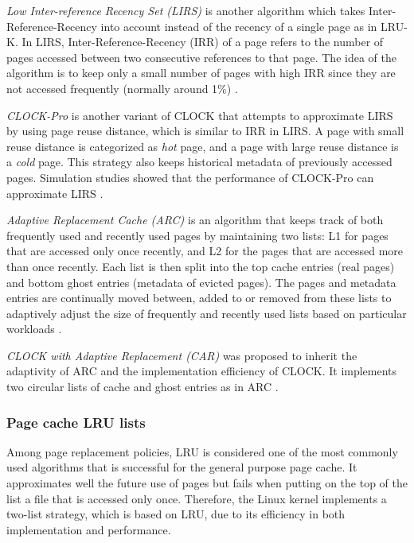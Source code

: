 \textit{Low Inter-reference Recency Set (LIRS)} is another algorithm 
which takes Inter-Reference-Recency into account instead of the recency 
of a single page as in LRU-K. 
In LIRS, Inter-Reference-Recency (IRR) of a page refers to the 
number of pages accessed between two consecutive references to that page. 
The idea of the algorithm is to keep only a small number of pages with 
high IRR since they are not accessed frequently (normally around 1\%) 
\cite{chavan2011comparison}. 

\textit{CLOCK-Pro} is another variant of CLOCK that attempts to approximate 
LIRS by using page reuse distance, which is similar to IRR in LIRS. 
A page with small reuse distance is categorized as \textit{hot} page, 
and a page with large reuse distance is a \textit{cold} page. This strategy also 
keeps historical metadata of previously accessed pages. 
Simulation studies showed that the performance of CLOCK-Pro can 
approximate LIRS \cite{chavan2011comparison}. 

\textit{Adaptive Replacement Cache (ARC)} is an algorithm that keeps track of
both frequently used and recently used pages by maintaining two lists: 
L1 for pages that are accessed only once recently, and L2 for the pages 
that are accessed more than once recently. 
Each list is then split into the top cache entries (real pages) and bottom 
ghost entries (metadata of evicted pages). 
The pages and metadata entries are continually moved between, 
added to or removed from these lists to adaptively adjust the size 
of frequently and recently used lists based on particular workloads  
\cite{chavan2011comparison}. 

\textit{CLOCK with Adaptive Replacement (CAR)} was proposed to inherit 
the adaptivity of ARC and the implementation efficiency of CLOCK.  
It implements two circular lists of cache and ghost entries as in ARC 
\cite{chavan2011comparison}. 

\subsubsection{Page cache LRU lists}

Among page replacement policies, LRU is considered one of the most commonly 
used algorithms that is successful for the general purpose page cache. 
It approximates well the future use of pages but fails when putting on the 
top of the list a file that is accessed only once. 
Therefore, the Linux kernel implements a two-list strategy, which is based on LRU, 
due to its efficiency in both implementation and performance. 

